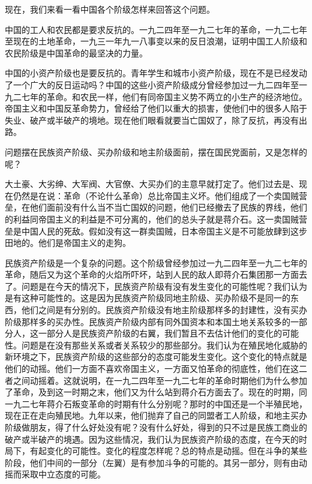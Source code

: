 现在，我们来看一看中国各个阶级怎样来回答这个问题。

中国的工人和农民都是要求反抗的。一九二四年至一九二七年的革命，一九二七年至现在的土地革命，一九三一年九一八事变以来的反日浪潮，证明中国工人阶级和农民阶级是中国革命的最坚决的力量。

中国的小资产阶级也是要反抗的。青年学生和城市小资产阶级，现在不是已经发动了一个广大的反日运动吗？中国的这些小资产阶级成分曾经参加过一九二四年至一九二七年的革命。和农民一样，他们有同帝国主义势不两立的小生产的经济地位。帝国主义和中国反革命势力，曾经给了他们以重大的损害，使他们中的很多人陷于失业、破产或半破产的境地。现在他们眼看就要当亡国奴了，除了反抗，再没有出路。

问题摆在民族资产阶级、买办阶级和地主阶级面前，摆在国民党面前，又是怎样的呢？

大土豪、大劣绅、大军阀、大官僚、大买办们的主意早就打定了。他们过去是、现在仍然是在说：革命（不论什么革命）总比帝国主义坏。他们组成了一个卖国贼营垒，在他们面前没有什么当不当亡国奴的问题，他们已经撤去了民族的界线，他们的利益同帝国主义的利益是不可分离的，他们的总头子就是蒋介石。这一卖国贼营垒是中国人民的死敌。假如没有这一群卖国贼，日本帝国主义是不可能放肆到这步田地的。他们是帝国主义的走狗。

民族资产阶级是一个复杂的问题。这个阶级曾经参加过一九二四年至一九二七年的革命，随后又为这个革命的火焰所吓坏，站到人民的敌人即蒋介石集团那一方面去了。问题是在今天的情况下，民族资产阶级有没有发生变化的可能性呢？我们认为是有这种可能性的。这是因为民族资产阶级同地主阶级、买办阶级不是同一的东西，他们之间是有分别的。民族资产阶级没有地主阶级那样多的封建性，没有买办阶级那样多的买办性。民族资产阶级内部有同外国资本和本国土地关系较多的一部分人，这一部分人是民族资产阶级的右翼，我们暂且不去估计他们的变化的可能性。问题是在没有那些关系或者关系较少的那些部分。我们认为在殖民地化威胁的新环境之下，民族资产阶级的这些部分的态度可能发生变化。这个变化的特点就是他们的动摇。他们一方面不喜欢帝国主义，一方面又怕革命的彻底性，他们在这二者之间动摇着。这就说明，在一九二四年至一九二七年的革命时期他们为什么参加了革命，及到这一时期之末，他们又为什么站到蒋介石方面去了。现在的时期，同一九二七年蒋介石叛变革命的时期有什么分别呢？那时的中国还是一个半殖民地，现在正在走向殖民地。九年以来，他们抛弃了自己的同盟者工人阶级，和地主买办阶级做朋友，得了什么好处没有呢？没有什么好处，得到的只不过是民族工商业的破产或半破产的境遇。因为这些情况，我们认为民族资产阶级的态度，在今天的时局下，有起变化的可能性。变化的程度怎样呢？总的特点是动摇。但在斗争的某些阶段，他们中间的一部分（左翼）是有参加斗争的可能的。其另一部分，则有由动摇而采取中立态度的可能。


